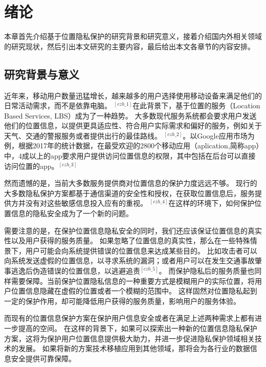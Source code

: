 \documentclass[zihao=-4]{ctexart}
\begin{document}
\section{绪论}
本章首先介绍基于位置隐私保护的研究背景和研究意义，接着介绍国内外相关领域的研究现状，然后引出本文研究的主要内容，最后给出本文各章节的内容安排。

\subsection{研究背景与意义}
近年来，移动用户数量迅猛增长，越来越多的用户选择使用移动设备来满足他们的日常活动需求，而不是依靠电脑。
$^{[czh\_1]}$在此背景下，基于位置的服务（Location Based Services, LBS）成为了一种趋势。
大多数现代服务系统都会要求用户发送他们的位置信息，以提供更具适应性、符合用户实际需求和偏好的服务，例如关于天气、交通的警报服务或者提供出行的最佳路线。
$^{[czh\_2]}$。以Google应用市场为例，根据2017年的统计数据，在最受欢迎的2800个移动应用（aplication,简称app）中，4成以上的app要求用户提供访问位置信息的权限，其中包括在后台可以直接访问位置的app。$^{[czh\_3]}$
\par
然而遗憾的是，当前大多数服务提供商对位置信息的保护力度远远不够。
现行的大多数隐私保护方案都基于通信渠道的安全性和授权，在获取位置信息后，服务提供方并没有对这些敏感信息投入应有的重视。
$^{[czh\_4]}$在这样的环境下，如何保护位置信息的隐私安全成为了一个新的问题。
\par
需要注意的是，在保护位置信息隐私安全的同时，我们还应该保证位置信息的真实性以及用户获得的服务质量。
如果忽略了位置信息的真实性，那么在一些特殊情景下，用户可能会向系统提供错误的位置信息来达成某些目的。
比如攻击者可以向系统发送虚假的位置信息，以寻求系统的漏洞；或者用户可以在发生交通事故肇事逃逸后伪造错误的位置信息，以逃避追责$^{[czh\_5]}$。
而保护隐私后的服务质量也同样需要保障。当前保护位置隐私信息的一种重要方式是模糊用户的实际位置，将用户位置信息隐藏在虚假的位置或者一个模糊的范围中。
这样固然对位置隐私起到一定的保护作用，却可能降低用户获得的服务质量，影响用户的服务体验。
\par
而现有的位置信息保护方案在保护用户信息安全或者在满足上述两种需求上都有进一步提高的空间。
在这样的背景下，如果可以探索出一种新的位置信息隐私保护方案，这将为保护用户位置信息提供极大助力，并进一步促进隐私保护领域相关技术的发展。
如果将新的方案技术移植应用到其他领域，那将会为各行业的数据信息安全提供可靠保障。
\end{document}

